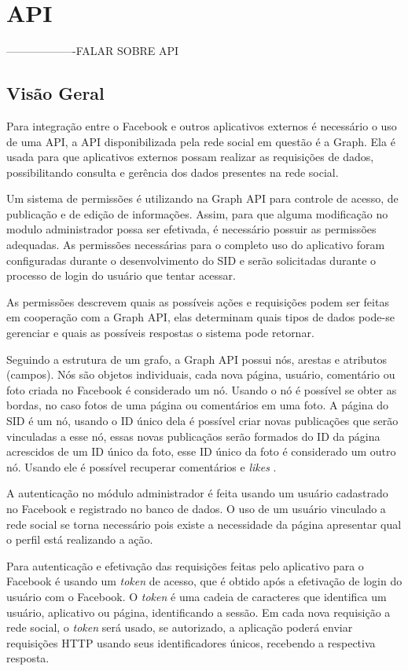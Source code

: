 \chapter[API]{API}

-------------------FALAR SOBRE API

\section{Visão Geral}
Para integração entre o Facebook e outros aplicativos externos é necessário o uso de uma API, a API disponibilizada pela rede social em questão é a Graph. Ela é usada para que aplicativos externos possam realizar as requisições de dados, possibilitando consulta e gerência dos dados presentes na rede social. 

Um sistema de permissões é utilizando na Graph API para controle de acesso, de publicação e de edição de informações. Assim, para que alguma modificação no modulo administrador possa ser efetivada, é necessário possuir as permissões adequadas. As permissões necessárias para o completo uso do aplicativo foram configuradas durante o desenvolvimento do SID e serão solicitadas durante o processo de login do usuário que tentar acessar.

As permissões descrevem quais as possíveis ações e requisições podem ser feitas em cooperação com a Graph API, elas determinam quais tipos de dados pode-se gerenciar e quais as possíveis respostas o sistema pode retornar.

Seguindo a estrutura de um grafo, a Graph API possui nós, arestas e atributos (campos). Nós são objetos individuais, cada nova página, usuário, comentário ou foto criada no Facebook é considerado um nó. Usando o nó é possível se obter as bordas, no caso fotos de uma página ou comentários em uma foto. A página do SID é um nó, usando o ID único dela é possível criar novas publicações que serão vinculadas a esse nó, essas novas publicaçãos serão formados do ID da página acrescidos de um ID único da foto, esse ID único da foto é considerado um outro nó. Usando ele é possível recuperar comentários e \textit{likes} \cite{facebook2018b}.

A autenticação no módulo administrador é feita usando um usuário cadastrado no Facebook e registrado no banco de dados. O uso de um usuário vinculado a rede social se torna necessário pois existe a necessidade da página apresentar qual o perfil está realizando a ação. 

Para autenticação e efetivação das requisições feitas pelo aplicativo para o Facebook é usando um \textit{token} de acesso, que é obtido após a efetivação de login do usuário com o Facebook. O \textit{token} é uma cadeia de caracteres que identifica um usuário, aplicativo ou página, identificando a sessão. Em cada nova requisição a rede social, o \textit{token} será usado, se autorizado, a aplicação poderá enviar requisições HTTP usando seus identificadores únicos, recebendo a respectiva resposta.


